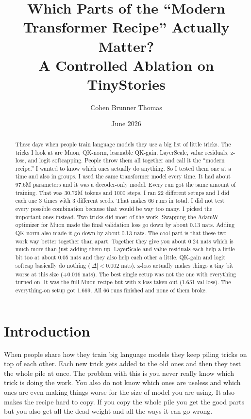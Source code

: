 \documentclass[11pt]{article}
\title{Which Parts of the ``Modern Transformer Recipe'' Actually Matter?\\
A Controlled Ablation on TinyStories}
\author{Cohen Brunner Thomas}
\date{June 2026}
\begin{document}
\maketitle

\begin{abstract}
These days when people train language models they use a big list of little
tricks. The tricks I look at are Muon, QK-norm, learnable QK-gain, LayerScale,
value residuals, z-loss, and logit softcapping. People throw them all together
and call it the ``modern recipe.'' I wanted to know which ones actually do
anything. So I tested them one at a time and also in groups. I used the same
transformer model every time. It had about 97.6M parameters and it was a
decoder-only model. Every run got the same amount of training. That was 30.72M
tokens and 1000 steps. I ran 22 different setups and I did each one 3 times with
3 different seeds. That makes 66 runs in total. I did not test every possible
combination because that would be way too many. I picked the important ones
instead. Two tricks did most of the work. Swapping the AdamW optimizer for Muon
made the final validation loss go down by about 0.13 nats. Adding QK-norm also
made it go down by about 0.13 nats. The cool part is that these two work way
better together than apart. Together they give you about 0.24 nats which is much
more than just adding them up. LayerScale and value residuals each help a little
bit too at about 0.05 nats and they also help each other a little. QK-gain and
logit softcap basically do nothing ($|\Delta| < 0.002$ nats). z-loss actually
makes things a tiny bit worse at this size ($+0.016$ nats). The best single setup
was not the one with everything turned on. It was the full Muon recipe but with
z-loss taken out (1.651 val loss). The everything-on setup got 1.669. All 66 runs
finished and none of them broke.
\end{abstract}

\section{Introduction}

When people share how they train big language models they keep piling tricks on
top of each other. Each new trick gets added to the old ones and then they test
the whole pile at once. The problem with this is you never really know which
trick is doing the work. You also do not know which ones are useless and which
ones are even making things worse for the size of model you are using. It also
makes the recipe hard to copy. If you copy the whole pile you get the good parts
but you also get all the dead weight and all the ways it can go wrong.
\end{document}
